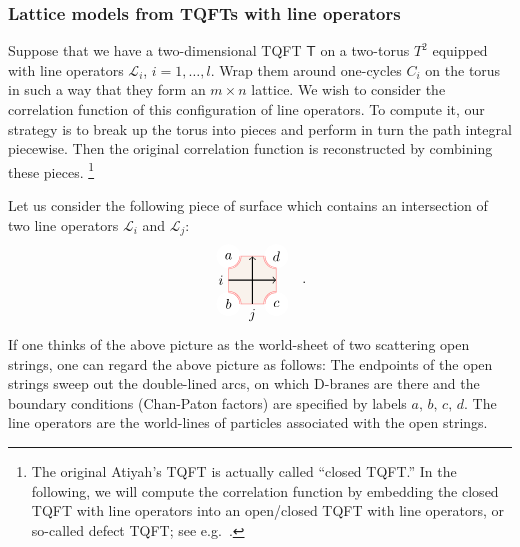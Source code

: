 \subsubsection{Lattice models from TQFTs with line operators}

Suppose that we have a two-dimensional TQFT $\mathsf{T}$ on a two-torus
$T^{2}$ equipped with line operators $\mathcal{L}_{i}$, $i=1,\ldots,l$.
Wrap them around one-cycles $C_{i}$ on the torus in such a way that
they form an $m\times n$ lattice. We wish to consider the correlation
function of this configuration of line operators. To compute it, our
strategy is to break up the torus into pieces and perform in turn
the path integral piecewise. Then the original correlation function
is reconstructed by combining these pieces.%
%
\footnote{The original Atiyah's TQFT is actually called ``closed TQFT.''
In the following, we will compute the correlation function by embedding
the closed TQFT with line operators into an open/closed TQFT with
line operators, or so-called defect TQFT; see e.g.~\cite{Moore:2006dw,Carqueville:2016nqk}. }
%

Let us consider the following piece of surface which contains an intersection
of two line operators $\mathcal{L}_{i}$ and $\mathcal{L}_{j}$:
\begin{equation}
  \label{eq:piece_of_lines}
    \begin{tikzpicture}[scale=0.6, baseline=(x.base)]
        \node (x) at (0,0) {\vphantom{x}};

        \draw[color=red!50, fill=brown!10] (-1,-1) rectangle (1,1);

        \fill[color=white] (-1,1) circle (0.5);  \node (a) at (-1,1) {$a$};
        \draw[draw=red!50, double]  (-1,0.5) arc (-90:0:0.5);
        \fill[color=white] (-1,-1) circle (0.5);  \node (b) at (-1,-1) {$b$};
        \draw[draw=red!50, double]  (-1,-0.5) arc (90:0:0.5);
        \fill[color=white] (1,-1) circle (0.5);  \node (c) at (1,-1) {$c$};
        \draw[draw=red!50, double]  (1,-0.5) arc (90:180:0.5);
        \fill[color=white] (1,1) circle (0.5);  \node (d) at (1,1) {$d$};
        \draw[draw=red!50, double]  (1,0.5) arc (-90:-180:0.5);

        \draw[thick, ->] (-1,0) node[left] {$i$} -- (1,0);
        \draw[thick, ->] (0,-1) node[below] {$j$} -- (0,1);

    \end{tikzpicture}
  \quad .
\end{equation}
If one thinks of the above picture as the world-sheet of two scattering
open strings, one can regard the above picture as follows: The endpoints
of the open strings sweep out the double-lined arcs, on which D-branes
are there and the boundary conditions (Chan-Paton factors) are specified
by labels $a,\,b,\,c,\,d$. The line operators are the world-lines
of particles associated with the open strings.


